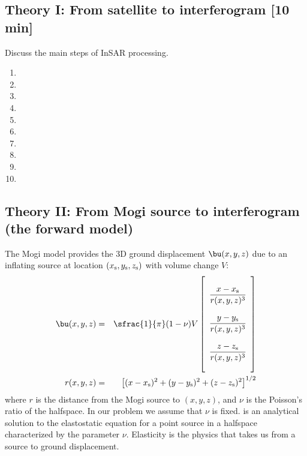 \documentclass[11pt,titlepage,fleqn]{article}
\begin{document}

\pagebreak
\subsection*{Theory I: From satellite to interferogram [10 min]}

Discuss the main steps of InSAR processing.
%
\begin{spacing}{3}
\begin{enumerate}
\item 
\item 
\item 
\item 
\item 
\item 
\item 
\item 
\item
\item
\end{enumerate}
\end{spacing}


\pagebreak
\subsection*{Theory II: From Mogi source to interferogram (the forward model)}

The Mogi model provides the 3D ground displacement $\bu(x,y,z)$ due to an inflating source at location $(x_{\rm s},y_{\rm s},z_{\rm s})$ with volume change $V$:
%
\begin{eqnarray}
\bu(x,y,z) &=& \sfrac{1}{\pi}(1 - \nu)V
\left[
\begin{array}{c} \\
\displaystyle{\frac{x-x_{\rm s}}{r(x,y,z)^3}} \\ \\
\displaystyle{\frac{y-y_{\rm s}}{r(x,y,z)^3}} \\ \\
\displaystyle{\frac{z-z_{\rm s}}{r(x,y,z)^3}} \\ \\
\end{array}
\right]
\label{forward}
\\
r(x,y,z) &=& \left[ (x-x_{\rm s})^2 + (y-y_{\rm s})^2 + (z-z_{\rm s})^2  \right]^{1/2}
\end{eqnarray}
%
where $r$ is the distance from the Mogi source to $(x,y,z)$, and $\nu$ is the Poisson's ratio of the halfspace. In our problem we assume that $\nu$ is fixed.  is an analytical solution to the elastostatic equation for a point source in a halfspace characterized by the parameter $\nu$. Elasticity is the physics that takes us from a source to ground displacement.
\end{document}
